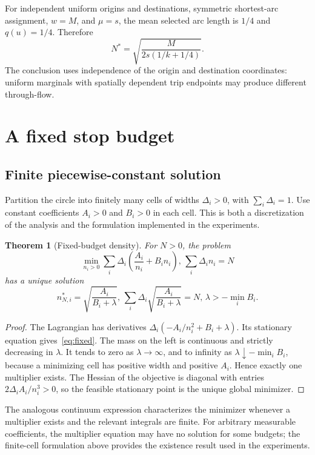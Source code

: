 \documentclass[11pt]{article}
\newtheorem{theorem}{Theorem}[section]
\theoremstyle{remark}\newtheorem{remark}[theorem]{Remark}
\begin{document}
For independent uniform origins and destinations, symmetric shortest-arc assignment, $w=M$, and $\mu=s$, the mean selected arc length is $1/4$ and $q(u)=1/4$. Therefore
\begin{equation}
N^*=\sqrt{\frac{M}{2s(1/k+1/4)}}.\label{eq:homogeneous}
\end{equation}
The conclusion uses independence of the origin and destination coordinates: uniform marginals with spatially dependent trip endpoints may produce different through-flow.

\section{A fixed stop budget}\label{sec:budget}
\subsection{Finite piecewise-constant solution}
Partition the circle into finitely many cells of widths $\Delta_i>0$, with $\sum_i\Delta_i=1$. Use constant coefficients $A_i>0$ and $B_i>0$ in each cell. This is both a discretization of the analysis and the formulation implemented in the experiments.

\begin{theorem}[Fixed-budget density]\label{thm:budget}
For $N>0$, the problem
\begin{equation}
\min_{n_i>0}\sum_i\Delta_i\left(\frac{A_i}{n_i}+B_i n_i\right),\,
\sum_i\Delta_i n_i=N\label{eq:finite}
\end{equation}
has a unique solution
\begin{equation}
n_{N,i}^*=\sqrt{\frac{A_i}{B_i+\lambda}},\,
\sum_i\Delta_i\sqrt{\frac{A_i}{B_i+\lambda}}=N,\,
\lambda>-\min_iB_i.\label{eq:fixed}
\end{equation}
\end{theorem}
\begin{proof}
The Lagrangian has derivatives $\Delta_i(-A_i/n_i^2+B_i+\lambda)$. Its stationary equation gives~\eqref{eq:fixed}. The mass on the left is continuous and strictly decreasing in $\lambda$. It tends to zero as $\lambda\to\infty$, and to infinity as $\lambda\downarrow-\min_iB_i$, because a minimizing cell has positive width and positive $A_i$. Hence exactly one multiplier exists. The Hessian of the objective is diagonal with entries $2\Delta_i A_i/n_i^3>0$, so the feasible stationary point is the unique global minimizer.
\end{proof}

The analogous continuum expression characterizes the minimizer whenever a multiplier exists and the relevant integrals are finite. For arbitrary measurable coefficients, the multiplier equation may have no solution for some budgets; the finite-cell formulation above provides the existence result used in the experiments.
\end{document}
